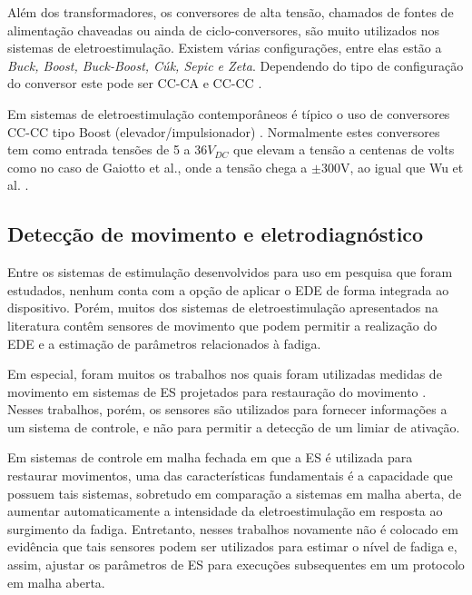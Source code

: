 Além dos transformadores, os conversores de alta tensão, chamados de fontes de alimentação chaveadas ou ainda de ciclo-conversores, são muito utilizados nos sistemas de eletroestimulação. Existem várias configurações, entre elas estão a \textit{Buck, Boost, Buck-Boost, Cúk, Sepic e Zeta}. Dependendo do tipo de configuração do conversor este pode ser CC-CA e CC-CC \cite{Ned2003PowerDesing}.

Em sistemas de eletroestimulação contemporâneos é típico o uso de conversores CC-CC tipo Boost (elevador/impulsionador) \cite{Faria2006ImplementacaoMedulares, Wu2002AApplications, NacimentoJunqueira2003EletroestimuladorDigital, Paredes2016DesenvolvimentoMusculoesqueletica}. Normalmente estes conversores tem como entrada tensões de 5 a 36$V_{DC}$ que elevam a tensão a centenas de volts como no caso de Gaiotto et al., onde a tensão chega a $\pm$300V, ao igual que Wu et al. \cite{Wu2002AApplications, Gaiotto2012EstimuladorEletricamente}.

\subsection{Detecção de movimento e eletrodiagnóstico}\label{cap:sec3.2.6}
Entre os sistemas de estimulação desenvolvidos para uso em pesquisa que foram estudados, nenhum conta com a opção de aplicar o EDE de forma integrada ao dispositivo. Porém, muitos dos sistemas de eletroestimulação apresentados na literatura contêm sensores de movimento que podem permitir a realização do EDE e a estimação de parâmetros relacionados à fadiga.

Em especial, foram muitos os trabalhos nos quais foram utilizadas medidas de movimento em sistemas de ES projetados para restauração do movimento \cite{Bo2016FES-inducedRejection, Catunda2016EstimulacaoCerebral,Ferrarin2001Model-basedMovements,Sharma2009NonlinearLimb,Schauer2005OnlineMuscle, Kobravi2009DecentralizedMuscles}. Nesses trabalhos, porém, os sensores são utilizados para fornecer informações a um sistema de controle, e não para permitir a detecção de um limiar de ativação.  %

Em sistemas de controle em malha fechada em que a ES é utilizada para restaurar movimentos, uma das características fundamentais é a capacidade que possuem tais sistemas, sobretudo em comparação a sistemas em malha aberta, de aumentar automaticamente a intensidade da eletroestimulação em resposta ao surgimento da fadiga. Entretanto, nesses trabalhos novamente não é colocado em evidência que tais sensores podem ser utilizados para estimar o nível de fadiga e, assim, ajustar os parâmetros de ES para execuções subsequentes em um protocolo em malha aberta.

